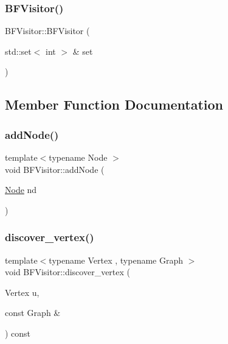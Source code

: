 \subsubsection{\texorpdfstring{BFVisitor()}{BFVisitor()}}
{\footnotesize\ttfamily B\+F\+Visitor\+::\+B\+F\+Visitor (\begin{DoxyParamCaption}\item[{std\+::set$<$ int $>$ \&}]{set }\end{DoxyParamCaption})\hspace{0.3cm}{\ttfamily [inline]}}



\subsection{Member Function Documentation}
\mbox{\label{class_b_f_visitor_acf3f5a29df895b4e903aa4100250a9f8}} 
\subsubsection{\texorpdfstring{addNode()}{addNode()}}
{\footnotesize\ttfamily template$<$typename Node $>$ \\
void B\+F\+Visitor\+::add\+Node (\begin{DoxyParamCaption}\item[{\mbox{\hyperlink{class_node}{Node}}}]{nd }\end{DoxyParamCaption})\hspace{0.3cm}{\ttfamily [inline]}}

\mbox{\label{class_b_f_visitor_a1ebe9cbc48241d4f36f8b973140b61a1}} 
\subsubsection{\texorpdfstring{discover\_vertex()}{discover\_vertex()}}
{\footnotesize\ttfamily template$<$typename Vertex , typename Graph $>$ \\
void B\+F\+Visitor\+::discover\+\_\+vertex (\begin{DoxyParamCaption}\item[{Vertex}]{u,  }\item[{const Graph \&}]{ }\end{DoxyParamCaption}) const\hspace{0.3cm}{\ttfamily [inline]}}

